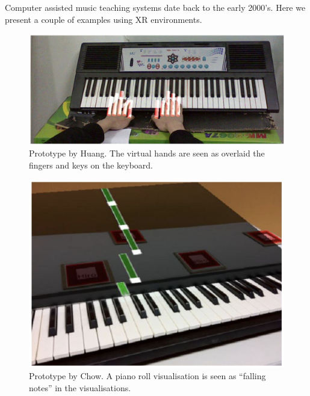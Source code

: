 \documentclass[manuscript,screen]{acmart}
\begin{document}
Computer assisted music teaching systems date back to the early 2000's. Here we present a couple of examples using XR environments. 

\begin{figure}[h]
\centering
 \includegraphics[width=12cm]{figures/huang.png}
    \caption{Prototype by Huang. The virtual hands are seen as overlaid the fingers and keys on the keyboard.
    }\label{fig:huang}
\end{figure}
\begin{figure}[h]
\centering
 \includegraphics[width=12cm]{figures/chow.png}
    \caption{Prototype by Chow. A piano roll visualisation is seen as ``falling notes'' in the visualisations.
    }\label{fig:chow}
\end{figure}
\end{document}
